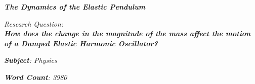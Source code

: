 

\begin{titlepage}
    \begin{center}
            
        \date{}
            
        \huge
            
            
        \vspace{0.25cm}
            
        \hline
            
        \vspace{2.5cm}
            
        \textit{\textbf{The Dynamics of the Elastic Pendulum}}
            
        \vspace{2.5cm}
            
        \LARGE
			
	\begin{flushleft}
            
        \textit{\huge Research Question: \LARGE \\ \textbf{How does the change in the magnitude of the mass affect the motion of a Damped Elastic Harmonic Oscillator? }}
            
	\end{flushleft}    
            
        \vspace{2.5cm}
            
        \Large
            
        \vspace{0.25cm}
        
		\textit{\textbf{Subject}: Physics}            

		\vspace{1cm}            
            
		\Large		
		        
		\vspace{0.25cm} 
			
	\begin{flushleft}
			


		\textit{\textbf{Word Count}: 3980}
			

\end{flushleft}
\end{center}
\end{titlepage}
